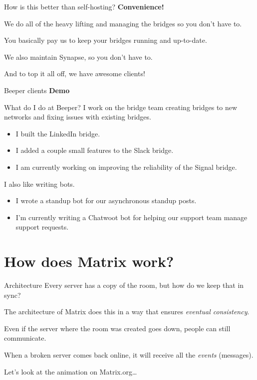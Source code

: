 \documentclass{acm}
\begin{document}
\begin{frame}{How is this better than self-hosting?}
    \textbf{Convenience!}
    \pause

    We do all of the heavy lifting and managing the bridges so you don't have
    to.

    You basically pay us to keep your bridges running and up-to-date.
    \pause

    We also maintain Synapse, so you don't have to.
    \pause

    And to top it all off, we have awesome clients!
\end{frame}

\begin{frame}{Beeper clients}
    \Huge
    \textbf{Demo}
\end{frame}

\begin{frame}{What do I do at Beeper?}
    I work on the bridge team creating bridges to new networks and fixing issues
    with existing bridges.

    \begin{itemize}
        \item I built the LinkedIn bridge.
        \item I added a couple small features to the Slack bridge.
        \item I am currently working on improving the reliability of the Signal
            bridge.
    \end{itemize}
    \pause

    I also like writing bots.

    \begin{itemize}
        \item I wrote a standup bot for our asynchronous standup posts.
        \item I'm currently writing a Chatwoot bot for helping our support team
            manage support requests.
    \end{itemize}
\end{frame}

\section{How does Matrix work?}

\begin{frame}{Architecture}
    Every server has a copy of the room, but how do we keep that in sync?
    \pause

    The architecture of Matrix does this in a way that ensures \textit{eventual
    consistency}.
    \pause

    Even if the server where the room was created goes down, people can still
    communicate.

    When a broken server comes back online, it will receive all the
    \textit{events} (messages).
    \pause

    Let's look at the animation on Matrix.org\ldots
\end{frame}
\end{document}
